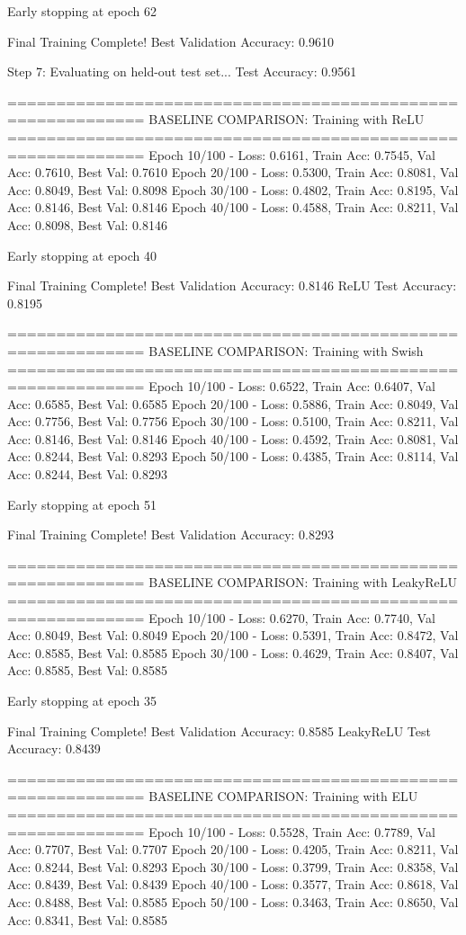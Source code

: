Early stopping at epoch 62

Final Training Complete!
Best Validation Accuracy: 0.9610

Step 7: Evaluating on held-out test set...
Test Accuracy: 0.9561

============================================================
BASELINE COMPARISON: Training with ReLU
============================================================
Epoch  10/100 - Loss: 0.6161, Train Acc: 0.7545, Val Acc: 0.7610, Best Val: 0.7610
Epoch  20/100 - Loss: 0.5300, Train Acc: 0.8081, Val Acc: 0.8049, Best Val: 0.8098
Epoch  30/100 - Loss: 0.4802, Train Acc: 0.8195, Val Acc: 0.8146, Best Val: 0.8146
Epoch  40/100 - Loss: 0.4588, Train Acc: 0.8211, Val Acc: 0.8098, Best Val: 0.8146

Early stopping at epoch 40

Final Training Complete!
Best Validation Accuracy: 0.8146
ReLU Test Accuracy: 0.8195

============================================================
BASELINE COMPARISON: Training with Swish
============================================================
Epoch  10/100 - Loss: 0.6522, Train Acc: 0.6407, Val Acc: 0.6585, Best Val: 0.6585
Epoch  20/100 - Loss: 0.5886, Train Acc: 0.8049, Val Acc: 0.7756, Best Val: 0.7756
Epoch  30/100 - Loss: 0.5100, Train Acc: 0.8211, Val Acc: 0.8146, Best Val: 0.8146
Epoch  40/100 - Loss: 0.4592, Train Acc: 0.8081, Val Acc: 0.8244, Best Val: 0.8293
Epoch  50/100 - Loss: 0.4385, Train Acc: 0.8114, Val Acc: 0.8244, Best Val: 0.8293

Early stopping at epoch 51

Final Training Complete!
Best Validation Accuracy: 0.8293

============================================================
BASELINE COMPARISON: Training with LeakyReLU
============================================================
Epoch  10/100 - Loss: 0.6270, Train Acc: 0.7740, Val Acc: 0.8049, Best Val: 0.8049
Epoch  20/100 - Loss: 0.5391, Train Acc: 0.8472, Val Acc: 0.8585, Best Val: 0.8585
Epoch  30/100 - Loss: 0.4629, Train Acc: 0.8407, Val Acc: 0.8585, Best Val: 0.8585

Early stopping at epoch 35

Final Training Complete!
Best Validation Accuracy: 0.8585
LeakyReLU Test Accuracy: 0.8439

============================================================
BASELINE COMPARISON: Training with ELU
============================================================
Epoch  10/100 - Loss: 0.5528, Train Acc: 0.7789, Val Acc: 0.7707, Best Val: 0.7707
Epoch  20/100 - Loss: 0.4205, Train Acc: 0.8211, Val Acc: 0.8244, Best Val: 0.8293
Epoch  30/100 - Loss: 0.3799, Train Acc: 0.8358, Val Acc: 0.8439, Best Val: 0.8439
Epoch  40/100 - Loss: 0.3577, Train Acc: 0.8618, Val Acc: 0.8488, Best Val: 0.8585
Epoch  50/100 - Loss: 0.3463, Train Acc: 0.8650, Val Acc: 0.8341, Best Val: 0.8585


